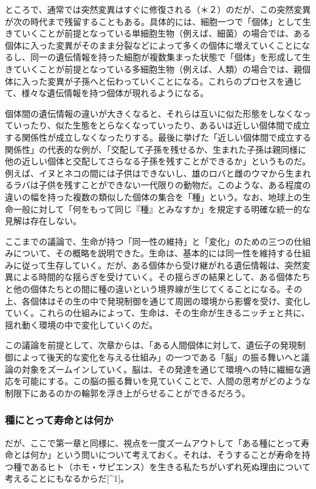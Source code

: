 ところで、通常では突然変異はすぐに修復される（＊２）のだが、この突然変異が次の時代まで残留することもある。具体的には、細胞一つで「個体」として生きていくことが前提となっている単細胞生物（例えば、細菌）の場合では、ある個体に入った変異がそのまま分裂などによって多くの個体に増えていくことになるし、同一の遺伝情報を持った細胞が複数集まった状態で「個体」を形成して生きていくことが前提となっている多細胞生物（例えば、人類）の場合では、親個体に入った変異が子孫へと伝わっていくことになる。これらのプロセスを通じて、様々な遺伝情報を持つ個体が現れるようになる。

個体間の遺伝情報の違いが大きくなると、それらは互いに似た形態をしなくなっていったり、似た生態をとらなくなっていったり、あるいは近しい個体間で成立する関係性が成立しなくなったりする。最後に挙げた「近しい個体間で成立する関係性」の代表的な例が、「交配して子孫を残せるか、生まれた子孫は親同様に他の近しい個体と交配してさらなる子孫を残すことができるか」というものだ。例えば、イヌとネコの間には子供はできないし、雄のロバと雌のウマから生まれるラバは子供を残すことができない一代限りの動物だ。このような、ある程度の違いの幅を持った複数の類似した個体の集合を「種」という。なお、地球上の生命一般に対して「何をもって同じ『種』とみなすか」を規定する明確な統一的な見解は存在しない。

ここまでの議論で、生命が持つ「同一性の維持」と「変化」のための三つの仕組みについて、その概略を説明できた。生命は、基本的には同一性を維持する仕組みに従って生存していく。だが、ある個体から受け継がれる遺伝情報は、突然変異による時間的な揺らぎを受けていく。その揺らぎの結果として、ある個体たちと他の個体たちとの間に種の違いという境界線が生じてくることになる。その上、各個体はその生の中で発現制御を通じて周囲の環境から影響を受け、変化していく。これらの仕組みによって、生命は、その生命が生きるニッチェと共に、揺れ動く環境の中で変化していくのだ。

この議論を前提として、次章からは、「ある人間個体に対して、遺伝子の発現制御によって後天的な変化を与える仕組み」の一つである「脳」の振る舞いへと議論の対象をズームインしていく。脳は、その発達を通じて環境への特に繊細な適応を可能にする。この脳の振る舞いを見ていくことで、人間の思考がどのような制限下にあるのかの輪郭を浮き上がらせることができるだろう。

\subsubsection{種にとって寿命とは何か}\label{ux7a2eux306bux3068ux3063ux3066ux5bffux547dux3068ux306fux4f55ux304b}

だが、ここで第一章と同様に、視点を一度ズームアウトして「ある種にとって寿命とは何か」という問いについて考えておく。それは、そうすることが寿命を持つ種であるヒト（ホモ・サピエンス）を生きる私たちがいずれ死ぬ理由について考えることにもなるからだ{[}\^{}1{]}。


